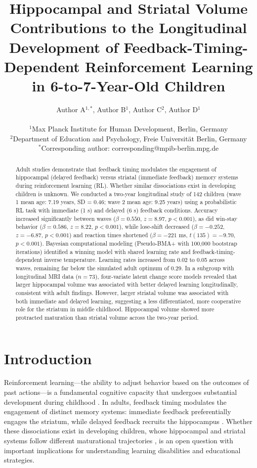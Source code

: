 \documentclass[11pt]{article}
\title{Hippocampal and Striatal Volume Contributions to the Longitudinal Development of Feedback-Timing-Dependent Reinforcement Learning in 6-to-7-Year-Old Children}
\author{
Author A$^{1,*}$, Author B$^{1}$, Author C$^{2}$, Author D$^{1}$ \\
\\
\small $^{1}$Max Planck Institute for Human Development, Berlin, Germany \\
\small $^{2}$Department of Education and Psychology, Freie Universit{\"a}t Berlin, Germany \\
\small $^{*}$Corresponding author: corresponding@mpib-berlin.mpg.de
}
\date{}
\begin{document}
\maketitle

\begin{abstract}
Adult studies demonstrate that feedback timing modulates the engagement of hippocampal (delayed feedback) versus striatal (immediate feedback) memory systems during reinforcement learning (RL). Whether similar dissociations exist in developing children is unknown. We conducted a two-year longitudinal study of 142 children (wave 1 mean age: 7.19 years, SD = 0.46; wave 2 mean age: 9.25 years) using a probabilistic RL task with immediate (1 s) and delayed (6 s) feedback conditions. Accuracy increased significantly between waves ($\beta = 0.550$, $z = 8.97$, $p < 0.001$), as did win-stay behavior ($\beta = 0.586$, $z = 8.22$, $p < 0.001$), while lose-shift decreased ($\beta = -0.252$, $z = -6.87$, $p < 0.001$) and reaction times shortened ($\beta = -221$ ms, $t(135) = -9.70$, $p < 0.001$). Bayesian computational modeling (Pseudo-BMA+ with 100,000 bootstrap iterations) identified a winning model with shared learning rate and feedback-timing-dependent inverse temperature. Learning rates increased from 0.02 to 0.05 across waves, remaining far below the simulated adult optimum of 0.29. In a subgroup with longitudinal MRI data ($n = 73$), four-variate latent change score models revealed that larger hippocampal volume was associated with better delayed learning longitudinally, consistent with adult findings. However, larger striatal volume was associated with both immediate and delayed learning, suggesting a less differentiated, more cooperative role for the striatum in middle childhood. Hippocampal volume showed more protracted maturation than striatal volume across the two-year period.
\end{abstract}

\section{Introduction}

Reinforcement learning---the ability to adjust behavior based on the outcomes of past actions---is a fundamental cognitive capacity that undergoes substantial development during childhood \citep{sutton1998, niv2009}. In adults, feedback timing modulates the engagement of distinct memory systems: immediate feedback preferentially engages the striatum, while delayed feedback recruits the hippocampus \citep{foerde2006, poldrack2001, shohamy2009}. Whether these dissociations exist in developing children, whose hippocampal and striatal systems follow different maturational trajectories \citep{goddings2014, tamnes2010}, is an open question with important implications for understanding learning disabilities and educational strategies.
\end{document}
